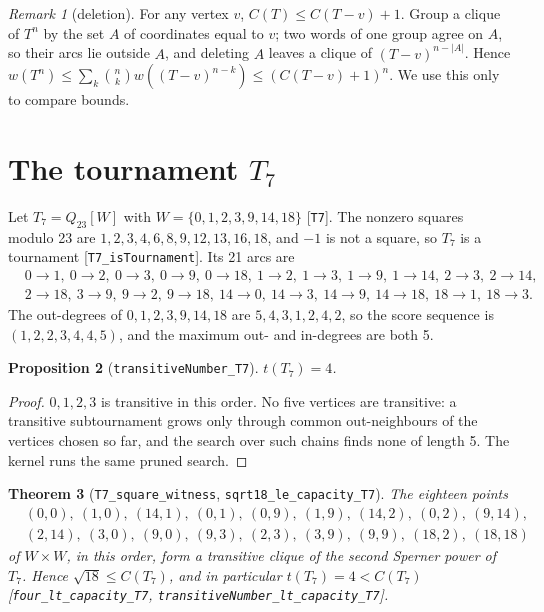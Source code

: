 \documentclass[11pt]{article}
\newtheorem{theorem}{Theorem}
\newtheorem{proposition}[theorem]{Proposition}
\theoremstyle{definition}
\theoremstyle{remark}
\newtheorem{remark}[theorem]{Remark}
\begin{document}
\begin{remark}[deletion]\label{rem:del}
For any vertex $v$, $C(T) \le C(T - v) + 1$. Group a clique of $T^n$ by the set $A$ of coordinates
equal to $v$; two words of one group agree on $A$, so their arcs lie outside $A$, and deleting $A$
leaves a clique of $(T-v)^{n-|A|}$. Hence
$w(T^n) \le \sum_k \binom{n}{k} w((T-v)^{n-k}) \le (C(T-v) + 1)^n$. We use this only to compare
bounds.
\end{remark}

\section{The tournament \texorpdfstring{$T_7$}{T7}}\label{sec:t7}

Let $T_7 = Q_{23}[W]$ with $W = \{0, 1, 2, 3, 9, 14, 18\}$ [\texttt{T7}]. The nonzero squares
modulo 23 are $1, 2, 3, 4, 6, 8, 9, 12, 13, 16, 18$, and $-1$ is not a square, so $T_7$ is a
tournament [\texttt{T7\_isTournament}]. Its 21 arcs are
\[
\begin{aligned}
&0{\to}1,\ 0{\to}2,\ 0{\to}3,\ 0{\to}9,\ 0{\to}18,\ 1{\to}2,\ 1{\to}3,\ 1{\to}9,\ 1{\to}14,\
2{\to}3,\ 2{\to}14,\\ &2{\to}18,\ 3{\to}9,\ 9{\to}2,\ 9{\to}18,\ 14{\to}0,\ 14{\to}3,\ 14{\to}9,\
14{\to}18,\ 18{\to}1,\ 18{\to}3.
\end{aligned}
\]
The out-degrees of $0, 1, 2, 3, 9, 14, 18$ are $5, 4, 3, 1, 2, 4, 2$, so the score sequence is
$(1, 2, 2, 3, 4, 4, 5)$, and the maximum out- and in-degrees are both 5.

\begin{proposition}[\texttt{transitiveNumber\_T7}]
$t(T_7) = 4$.
\end{proposition}

\begin{proof}
$0, 1, 2, 3$ is transitive in this order. No five vertices are transitive: a transitive
subtournament grows only through common out-neighbours of the vertices chosen so far, and the
search over such chains finds none of length 5. The kernel runs the same
pruned search.
\end{proof}

\begin{theorem}[\texttt{T7\_square\_witness}, \texttt{sqrt18\_le\_capacity\_T7}]\label{thm:18}
The eighteen points
\[
\begin{aligned}
&(0,0),\ (1,0),\ (14,1),\ (0,1),\ (0,9),\ (1,9),\ (14,2),\ (0,2),\ (9,14),\\
&(2,14),\ (3,0),\ (9,0),\ (9,3),\ (2,3),\ (3,9),\ (9,9),\ (18,2),\ (18,18)
\end{aligned}
\]
of $W \times W$, in this order, form a transitive clique of the second Sperner power of $T_7$.
Hence $\sqrt{18} \le C(T_7)$, and in particular $t(T_7) = 4 < C(T_7)$
[\texttt{four\_lt\_capacity\_T7}, \texttt{transitiveNumber\_lt\_capacity\_T7}].
\end{theorem}
\end{document}
